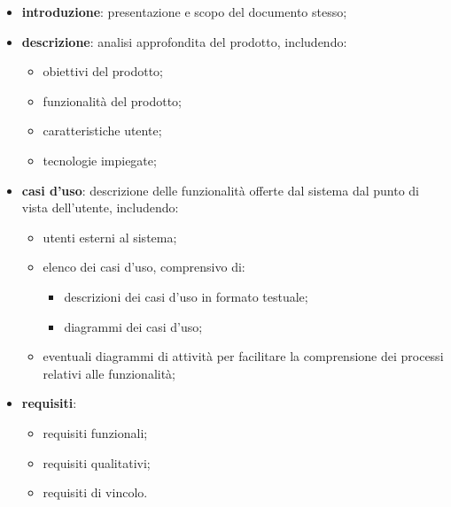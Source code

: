 \begin{itemize}
	\item \textbf{introduzione}: presentazione e scopo del documento stesso;
	\item \textbf{descrizione}:  analisi approfondita del prodotto, includendo:
	      \begin{itemize}
		      \item obiettivi del prodotto;
		      \item funzionalità del prodotto;
		      \item caratteristiche utente;
		      \item tecnologie impiegate;
	      \end{itemize}
	\item \textbf{casi d'uso}: descrizione delle funzionalità offerte dal sistema dal punto di vista dell'utente, includendo:
	      \begin{itemize}
		      \item utenti esterni al sistema;
		      \item elenco dei casi d'uso, comprensivo di:
		            \begin{itemize}
			            \item descrizioni dei casi d'uso in formato testuale;
			            \item diagrammi dei casi d'uso;
		            \end{itemize}
		      \item eventuali diagrammi di attività per facilitare la comprensione dei processi relativi alle funzionalità;
	      \end{itemize}
	\item \textbf{requisiti}:
	      \begin{itemize}
		      \item requisiti funzionali;
		      \item requisiti qualitativi;
		      \item requisiti di vincolo.
	      \end{itemize}
\end{itemize}


